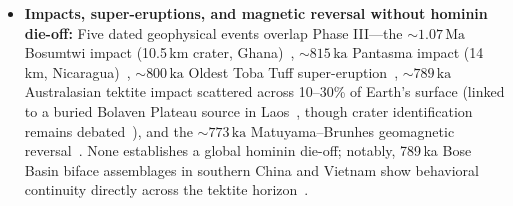 \begin{itemize}[leftmargin=1.3em,itemsep=1.5pt,topsep=2pt]
\item \textbf{Impacts, super-eruptions, and magnetic reversal without hominin die-off:} Five dated geophysical events overlap Phase III---the $\sim\!1.07\,\mathrm{Ma}$ Bosumtwi impact (10.5\,km crater, Ghana)~\cite{koeberl2007}, $\sim\!815\,\mathrm{ka}$ Pantasma impact (14\,km, Nicaragua)~\cite{rochette2019}, $\sim\!800\,\mathrm{ka}$ Oldest Toba Tuff super-eruption~\cite{ito2020}, $\sim\!789\,\mathrm{ka}$ Australasian tektite impact scattered across 10--30\% of Earth's surface (linked to a buried Bolaven Plateau source in Laos~\cite{jourdan2019,sieh2020,sieh2024}, though crater identification remains debated~\cite{mizera2024}), and the $\sim\!773\,\mathrm{ka}$ Matuyama--Brunhes geomagnetic reversal~\cite{singer2019}. None establishes a global hominin die-off; notably, 789\,ka Bose Basin biface assemblages in southern China and Vietnam show behavioral continuity directly across the tektite horizon~\cite{michel2024}.

\end{itemize}
